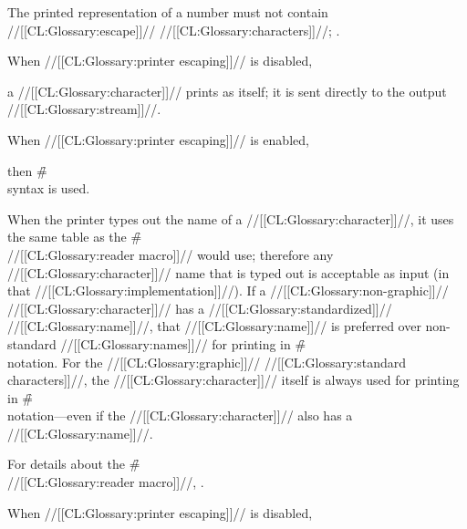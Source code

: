 \endsubsubsubsection%

The printed representation of a number must not contain //[[CL:Glossary:escape]]// //[[CL:Glossary:characters]]//;
\seesection\EscCharsAndPotentialNums.

\endsubsubsubsection%
\endsubsubsection%



When //[[CL:Glossary:printer escaping]]// is disabled,

a //[[CL:Glossary:character]]// prints as itself;
it is sent directly to the output //[[CL:Glossary:stream]]//.

When //[[CL:Glossary:printer escaping]]// is enabled,

then \f{\#\\} syntax is used.



When the printer types out the name of a //[[CL:Glossary:character]]//,
it uses the same table as the \f{\#\\} //[[CL:Glossary:reader macro]]// would use;
therefore any //[[CL:Glossary:character]]// name that is typed out
is acceptable as input (in that //[[CL:Glossary:implementation]]//).
If a //[[CL:Glossary:non-graphic]]// //[[CL:Glossary:character]]// has a //[[CL:Glossary:standardized]]// //[[CL:Glossary:name]]//,
that //[[CL:Glossary:name]]// is preferred over non-standard //[[CL:Glossary:names]]//
for printing in \f{\#\\} notation.
For the //[[CL:Glossary:graphic]]// //[[CL:Glossary:standard characters]]//,
the //[[CL:Glossary:character]]// itself is always used
for printing in \f{\#\\} notation---even if 
the //[[CL:Glossary:character]]// also has a //[[CL:Glossary:name]]//.

For details about the \f{\#\\} //[[CL:Glossary:reader macro]]//, \seesection\SharpsignBackslash.

\endsubsubsection%




When //[[CL:Glossary:printer escaping]]// is disabled,

